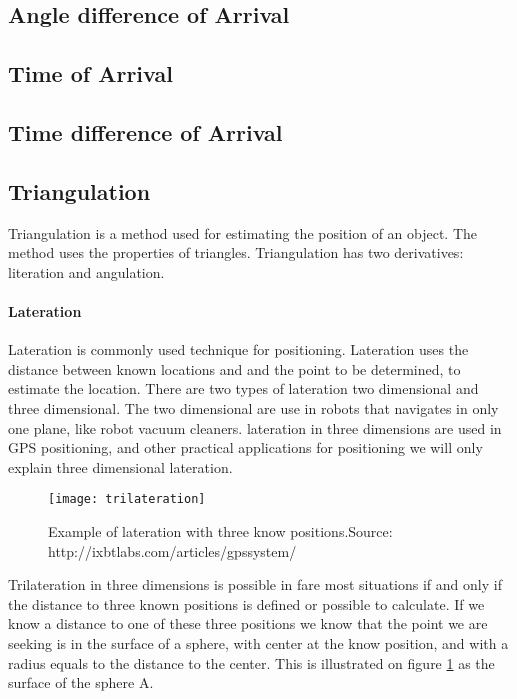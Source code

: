  \subsection{Angle difference of Arrival}

  \subsection{Time of Arrival}

  \subsection{Time difference of Arrival}

  \subsection{Triangulation}

  Triangulation is a method used for estimating the position of an object. The method uses the properties of triangles. Triangulation has two derivatives: literation and angulation.

 \paragraph{Lateration}

  Lateration is commonly used technique for positioning.  Lateration uses the distance between known locations and and the point to be determined, to estimate the location.\cite{tri_lateration}  There are two types of lateration two dimensional and three dimensional. The two dimensional are use in robots that navigates in only one plane, like robot vacuum cleaners. 
  lateration in three dimensions are used in GPS positioning, and other practical applications for positioning
  we will only explain three dimensional lateration.
  \begin{figure}[h!]
  \centering
  \texttt{[image: trilateration]}
  \caption{Example of lateration with three know positions.\newline Source: http://ixbtlabs.com/articles/gpssystem/}
  \label{fig:trilateration}
  \end{figure}
  

  Trilateration in three dimensions is possible in fare most situations if and only if the distance to three known positions is defined or possible to calculate.
  If we know a distance to one of these three positions we know that the point we are seeking is in the surface of a sphere, with center at the know position, and with a radius equals to the distance to the center. This is illustrated on figure \ref{fig:trilateration} as the surface of the sphere A.

